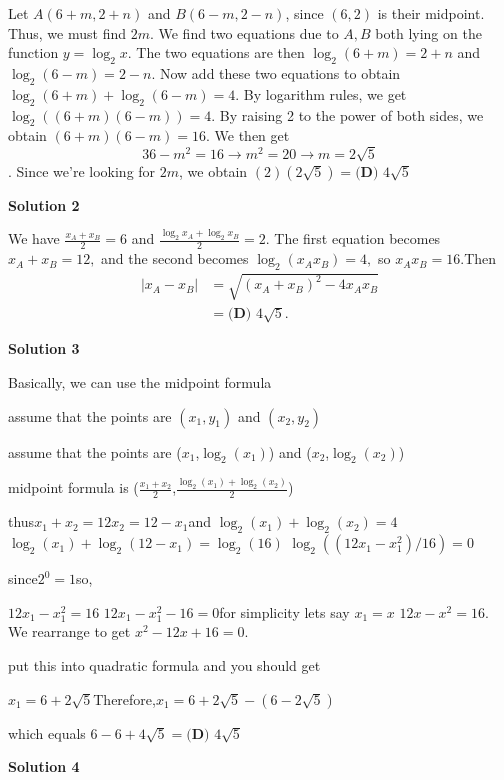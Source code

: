 \begin{enumerate}
Let $A(6+m,2+n)$ and $B(6-m,2-n)$, since $(6,2)$ is their midpoint. Thus, we must find $2m$. We find two equations due to $A,B$ both lying on the function $y=\log_{2}x$. The two equations are then $\log_{2}(6+m)=2+n$ and $\log_{2}(6-m)=2-n$. Now add these two equations to obtain $\log_{2}(6+m)+\log_{2}(6-m)=4$. By logarithm rules, we get $\log_{2}((6+m)(6-m))=4$. By raising 2 to the power of  both sides, we obtain $(6+m)(6-m)=16$. We then get 
 \[36-m^2=16 \rightarrow m^2=20 \rightarrow m=2\sqrt{5}\]. Since we're looking for $2m$, we obtain $(2)(2\sqrt{5})=\boxed{\textbf{(D) }4\sqrt{5}}$




\textbf{Solution 2}

We have $\frac{x_A + x_B}{2} = 6$ and $\frac{\log_2 x_A + \log_2 x_B}{2} = 2$. The first equation becomes $x_A + x_B = 12,$ and the second becomes $\log_2(x_A x_B) = 4,$ so $x_A x_B = 16.$Then
 \begin{align*} \left| x_A - x_B \right| & = \sqrt{\left( x_A + x_B \right)^2 - 4 x_A x_B} \\ & = \boxed{\textbf{(D) } 4 \sqrt{5}}. \end{align*}





\textbf{Solution 3}

Basically, we can use the midpoint formula 

 assume that the points are $(x_1,y_1)$ and $(x_2,y_2)$

 assume that the points are ($x_1$,$\log_{2}(x_1)$) and ($x_2$,$\log_{2}(x_2)$)

 
midpoint formula is ($\frac{x_1+x_2}{2}$,$\frac{\log_{2}(x_1)+\log_{2}(x_2)}{2}$)

 
thus$x_1+x_2=12$$x_2=12-x_1$and $\log_{2}(x_1)+\log_{2}(x_2)=4$$\log_{2}(x_1)+\log_{2}(12-x_1)=\log_{2}(16)$
$\log_{2}((12x_1-x_1^2)/16)=0$

 since$2^0=1$so,

 $12x_1-x_1^2=16$
$12x_1-x_1^2-16=0$for simplicity lets say $x_1 = x$
$12x-x^2=16$. We rearrange to get $x^2-12x+16=0$.

 put this into quadratic formula and you should get

 $x_1=6+2\sqrt{5}$Therefore,$x_1=6+2\sqrt{5}-(6-2\sqrt{5})$

 which equals $6-6+4\sqrt{5}=\boxed{\textbf{(D) }4\sqrt{5}}$




\textbf{Solution 4}


\end{enumerate}
